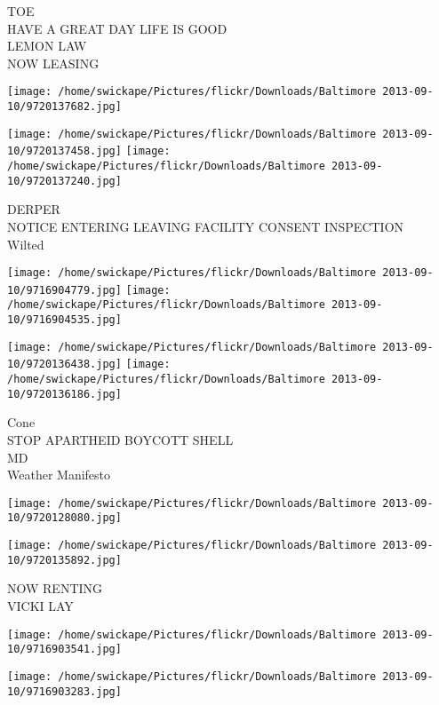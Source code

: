 \documentclass[10pt,letterpaper]{article}
\begin{document}
TOE\\
HAVE A GREAT DAY LIFE IS GOOD\\
LEMON LAW\\
NOW LEASING\\
\pagebreak

\texttt{[image: /home/swickape/Pictures/flickr/Downloads/Baltimore 2013-09-10/9720137682.jpg]}

\vspace{0.25in}
\texttt{[image: /home/swickape/Pictures/flickr/Downloads/Baltimore 2013-09-10/9720137458.jpg]}
\texttt{[image: /home/swickape/Pictures/flickr/Downloads/Baltimore 2013-09-10/9720137240.jpg]}

DERPER\\
NOTICE ENTERING LEAVING FACILITY CONSENT INSPECTION\\
Wilted\\
\pagebreak

\texttt{[image: /home/swickape/Pictures/flickr/Downloads/Baltimore 2013-09-10/9716904779.jpg]}
\texttt{[image: /home/swickape/Pictures/flickr/Downloads/Baltimore 2013-09-10/9716904535.jpg]}

\texttt{[image: /home/swickape/Pictures/flickr/Downloads/Baltimore 2013-09-10/9720136438.jpg]}
\texttt{[image: /home/swickape/Pictures/flickr/Downloads/Baltimore 2013-09-10/9720136186.jpg]}

Cone\\
STOP APARTHEID BOYCOTT SHELL\\
MD\\
Weather Manifesto\\
\pagebreak

\texttt{[image: /home/swickape/Pictures/flickr/Downloads/Baltimore 2013-09-10/9720128080.jpg]}

\vspace{0.25in}
\texttt{[image: /home/swickape/Pictures/flickr/Downloads/Baltimore 2013-09-10/9720135892.jpg]}

NOW RENTING\\
VICKI LAY\\
\pagebreak

\texttt{[image: /home/swickape/Pictures/flickr/Downloads/Baltimore 2013-09-10/9716903541.jpg]}

\vspace{0.25in}
\texttt{[image: /home/swickape/Pictures/flickr/Downloads/Baltimore 2013-09-10/9716903283.jpg]}
\end{document}
